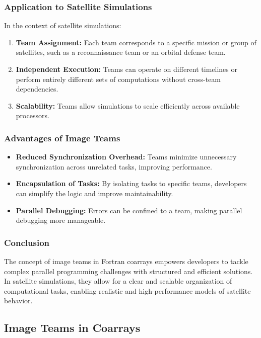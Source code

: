 \subsubsection{Application to Satellite Simulations}
In the context of satellite simulations:
\begin{enumerate}
    \item \textbf{Team Assignment:} Each team corresponds to a specific mission or group of satellites, such as a reconnaissance team or an orbital defense team.
    \item \textbf{Independent Execution:} Teams can operate on different timelines or perform entirely different sets of computations without cross-team dependencies.
    \item \textbf{Scalability:} Teams allow simulations to scale efficiently across available processors.
\end{enumerate}

\subsubsection{Advantages of Image Teams}
\begin{itemize}
    \item \textbf{Reduced Synchronization Overhead:} Teams minimize unnecessary synchronization across unrelated tasks, improving performance.
    \item \textbf{Encapsulation of Tasks:} By isolating tasks to specific teams, developers can simplify the logic and improve maintainability.
    \item \textbf{Parallel Debugging:} Errors can be confined to a team, making parallel debugging more manageable.
\end{itemize}

\subsubsection{Conclusion}
The concept of image teams in Fortran coarrays empowers developers to tackle complex parallel programming challenges with structured and efficient solutions. In satellite simulations, they allow for a clear and scalable organization of computational tasks, enabling realistic and high-performance models of satellite behavior.
\subsection{Image Teams in Coarrays}
\label{ssec:image-teams}

